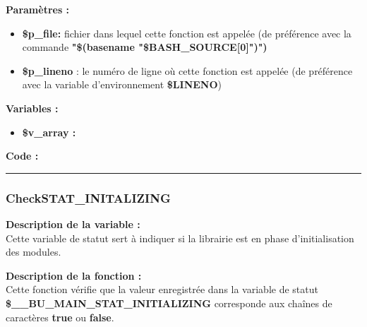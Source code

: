 \documentclass[a4paper,10pt]{article}
\begin{document}
\begin{justify}
    \textbf{Paramètres :}
    \begin{itemize}
        \item \textbf{\color{orange}\$p\_file\color{white}:} fichier dans lequel cette fonction est appelée (de préférence avec la commande \textbf{\textbf{"\$(\color{gray}basename \color{white}"\color{orange}\$BASH\_SOURCE[0]\color{white}")")}}\\

        \item \color{orange}\textbf{\$p\_lineno}\color{white} : le numéro de ligne où cette fonction est appelée (de préférence avec la variable d'environnement \textbf{\color{orange}\$LINENO})
    \end{itemize}
\end{justify}

\begin{justify}
    \textbf{Variables :}

    \begin{itemize}
        \item \textbf{\color{orange}\$v\_array\color{white} :}
    \end{itemize}
\end{justify}

\begin{justify}
    \textbf{Code :}
\end{justify}


\color{blue}\par\noindent\rule{\textwidth}{0.4pt}\color{white}

\color{blue}
\subsubsection{CheckSTAT\_INITALIZING}\color{white}

\begin{justify}
    \textbf{Description de la variable :}\\
    Cette variable de statut sert à indiquer si la librairie est en phase d'initialisation des modules.
\end{justify}

\begin{justify}
    \textbf{Description de la fonction :}\\
    Cette fonction vérifie que la valeur enregistrée dans la variable de statut \textbf{\color{orange}\$\_\_BU\_MAIN\_STAT\_INITIALIZING} corresponde aux chaînes de caractères \textbf{true} ou \textbf{false}.
\end{justify}
\end{document}
